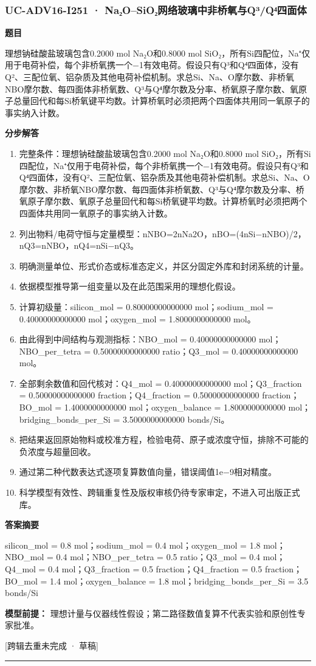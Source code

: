\documentclass[UTF8,11pt,a4paper]{ctexart}
\begin{document}
\subsubsection*{UC-ADV16-I251 · Na₂O–SiO₂网络玻璃中非桥氧与Q³/Q⁴四面体}
\noindent\textbf{题目}\par
理想钠硅酸盐玻璃包含0.2000 mol Na₂O和0.8000 mol SiO₂，所有Si四配位，Na⁺仅用于电荷补偿，每个非桥氧携一个−1有效电荷。假设只有Q³和Q⁴四面体，没有Q²、三配位氧、铝杂质及其他电荷补偿机制。求总Si、Na、O摩尔数、非桥氧NBO摩尔数、每四面体非桥氧数、Q³与Q⁴摩尔数及分率、桥氧原子摩尔数、氧原子总量回代和每Si桥氧键平均数。计算桥氧时必须把两个四面体共用同一氧原子的事实纳入计数。\par
\medskip\noindent\textbf{分步解答}
\begin{enumerate}
\item 完整条件：理想钠硅酸盐玻璃包含0.2000 mol Na₂O和0.8000 mol SiO₂，所有Si四配位，Na⁺仅用于电荷补偿，每个非桥氧携一个−1有效电荷。假设只有Q³和Q⁴四面体，没有Q²、三配位氧、铝杂质及其他电荷补偿机制。求总Si、Na、O摩尔数、非桥氧NBO摩尔数、每四面体非桥氧数、Q³与Q⁴摩尔数及分率、桥氧原子摩尔数、氧原子总量回代和每Si桥氧键平均数。计算桥氧时必须把两个四面体共用同一氧原子的事实纳入计数。
\item 列出物料/电荷守恒与定量模型：nNBO=2nNa2O，nBO=(4nSi−nNBO)/2，nQ3=nNBO，nQ4=nSi−nQ3。
\item 明确测量单位、形式价态或标准态定义，并区分固定外库和封闭系统的计量。
\item 依据模型推导第一组变量以及在此范围采用的理想化假设。
\item 计算初级量：silicon\_mol = 0.80000000000000 mol；sodium\_mol = 0.40000000000000 mol；oxygen\_mol = 1.8000000000000 mol。
\item 由此得到中间结构与观测指标：NBO\_mol = 0.40000000000000 mol；NBO\_per\_tetra = 0.50000000000000 ratio；Q3\_mol = 0.40000000000000 mol。
\item 全部剩余数值和回代核对：Q4\_mol = 0.40000000000000 mol；Q3\_fraction = 0.50000000000000 fraction；Q4\_fraction = 0.50000000000000 fraction；BO\_mol = 1.4000000000000 mol；oxygen\_balance = 1.8000000000000 mol；bridging\_bonds\_per\_Si = 3.5000000000000 bonds/Si。
\item 把结果返回原始物料或校准方程，检验电荷、原子或浓度守恒，排除不可能的负浓度与超量回收。
\item 通过第二种代数表达式逐项复算数值向量，错误阈值1e−9相对精度。
\item 科学模型有效性、跨辑重复性及版权审核仍待专家审定，不进入可出版正式库。
\end{enumerate}
\noindent\textbf{答案摘要}\par
silicon\_mol = 0.8 mol；sodium\_mol = 0.4 mol；oxygen\_mol = 1.8 mol；NBO\_mol = 0.4 mol；NBO\_per\_tetra = 0.5 ratio；Q3\_mol = 0.4 mol；Q4\_mol = 0.4 mol；Q3\_fraction = 0.5 fraction；Q4\_fraction = 0.5 fraction；BO\_mol = 1.4 mol；oxygen\_balance = 1.8 mol；bridging\_bonds\_per\_Si = 3.5 bonds/Si\par
\noindent\textbf{模型前提：}
理想计量与仪器线性假设；第二路径数值复算不代表实验和原创性专家批准。\par
\noindent\textcolor{red!65!black}{[跨辑去重未完成 · 草稿]} \par
\medskip\hrule\medskip
{}
\end{document}
